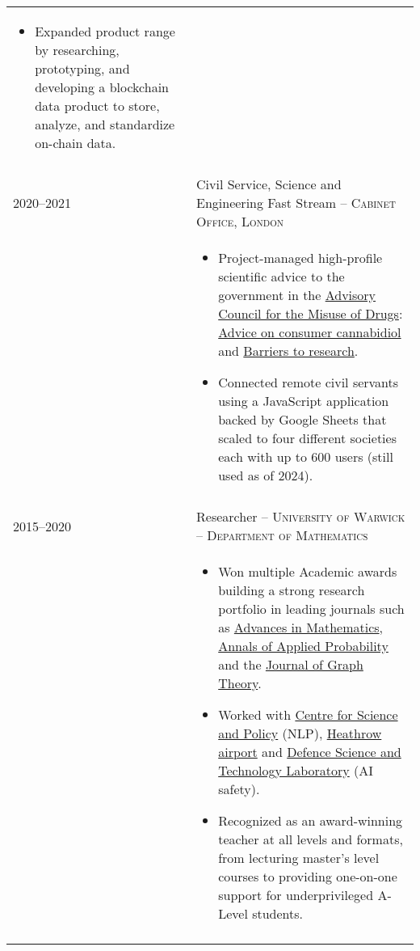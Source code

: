 \documentclass[a4paper,10pt]{article}
\begin{document}
\begin{tabular}{p{2.25cm}|p{15cm}}
\begin{itemize}
	 	\item Expanded product range by researching, prototyping, and developing a blockchain data product to store, analyze, and standardize on-chain data.
	\end{itemize}\vspace{-0.1 in}\\
\multicolumn{2}{c}{}\\
%
%
	\textsc{2020--2021} & \large{Civil Service, Science and Engineering Fast Stream -- \textsc{Cabinet Office, London}}\\
 	 & \vspace{-0.07 in}\begin{itemize}
 	 	\item Project-managed high-profile scientific advice to the government in the \href{https://www.gov.uk/government/organisations/advisory-council-on-the-misuse-of-drugs}{Advisory Council for the Misuse of Drugs}: \href{https://www.gov.uk/government/publications/acmd-advice-on-consumer-cannabidiol-cbd-products}{Advice on consumer cannabidiol} and \href{https://www.gov.uk/government/publications/consideration-of-barriers-to-research-part-1}{Barriers to research}.
		\item Connected remote civil servants using a JavaScript application backed by Google Sheets that scaled to four different societies each with up to 600 users (still used as of 2024).
	\end{itemize}\vspace{-0.1 in}\\
\multicolumn{2}{c}{} \\
%
%
	\textsc{2015--2020} & \large{Researcher -- \textsc{University of Warwick} -- \textsc{Department of Mathematics}}\\
	 & \vspace{-0.07 in}\begin{itemize}
	\item Won multiple Academic awards building a strong research portfolio in leading journals such as \href{https://www.sciencedirect.com/science/article/pii/S0001870818303347}{Advances in Mathematics}, \href{https://projecteuclid.org/journals/annals-of-applied-probability/volume-32/issue-1/From-the-Bernoulli-factory-to-a-dice-enterprise-via-perfect/10.1214/21-AAP1679.short}{Annals of Applied Probability} and the \href{http://onlinelibrary.wiley.com/doi/10.1002/jgt.22002/abstract}{Journal of Graph Theory}.
	\item Worked with \href{https://www.csap.cam.ac.uk/}{Centre for Science and Policy} (NLP), \href{https://www.heathrow.com/}{Heathrow airport} and \href{https://www.gov.uk/government/organisations/defence-science-and-technology-laboratory}{Defence Science and Technology Laboratory} (AI safety).
	\item Recognized as an award-winning teacher at all levels and formats, from lecturing master's level courses to providing one-on-one support for underprivileged A-Level students.
\end{itemize}\vspace{-0.1 in}\\
\multicolumn{2}{c}{} \\
\end{tabular}
\end{document}
